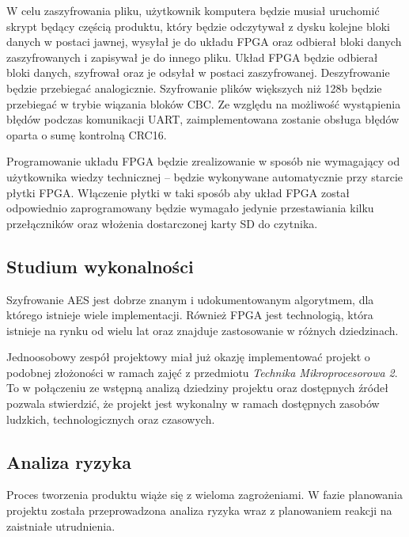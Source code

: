 W celu zaszyfrowania pliku, użytkownik komputera będzie musiał uruchomić skrypt będący częścią produktu, który będzie odczytywał z dysku kolejne bloki danych w postaci jawnej, wysyłał je do układu FPGA oraz odbierał bloki danych zaszyfrowanych i zapisywał je do innego pliku. Układ FPGA będzie odbierał bloki danych, szyfrował oraz je odsyłał w postaci zaszyfrowanej. Deszyfrowanie będzie przebiegać analogicznie. Szyfrowanie plików większych niż 128b będzie przebiegać w trybie wiązania bloków CBC. Ze względu na możliwość wystąpienia błędów podczas komunikacji UART, zaimplementowana zostanie obsługa błędów oparta o sumę kontrolną CRC16.

Programowanie układu FPGA będzie zrealizowanie w sposób nie wymagający od użytkownika wiedzy technicznej -- będzie wykonywane automatycznie przy starcie płytki FPGA. Włączenie płytki w taki sposób aby układ FPGA został odpowiednio zaprogramowany będzie wymagało jedynie przestawiania kilku przełączników oraz włożenia dostarczonej karty SD do czytnika. 

\subsection{Studium wykonalności}
Szyfrowanie AES jest dobrze znanym i udokumentowanym algorytmem, dla którego istnieje wiele implementacji. Również FPGA jest technologią, która istnieje na rynku od wielu lat oraz znajduje zastosowanie w różnych dziedzinach. 

Jednoosobowy zespół projektowy miał już okazję implementować projekt o podobnej złożoności w ramach zajęć z przedmiotu \textit{Technika Mikroprocesorowa 2}. To w połączeniu ze wstępną analizą dziedziny projektu oraz dostępnych źródeł pozwala stwierdzić, że projekt jest wykonalny w ramach dostępnych zasobów ludzkich, technologicznych oraz czasowych.

\subsection{Analiza ryzyka}
Proces tworzenia produktu wiąże się z wieloma zagrożeniami. W fazie planowania projektu została przeprowadzona analiza ryzyka wraz z planowaniem reakcji na zaistniałe utrudnienia.

